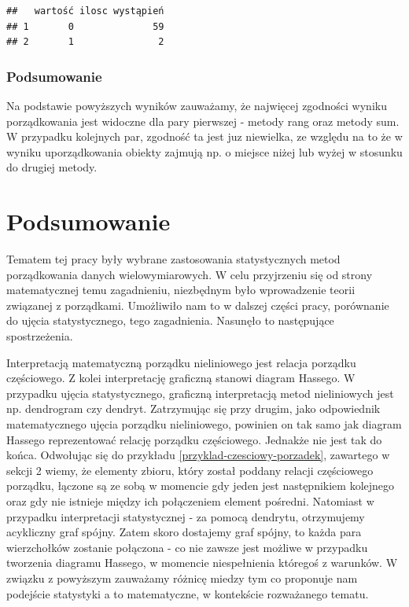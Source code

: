 \documentclass[12pt,a4paper]{report}
\begin{document}
{\begin{verbatim}
##   wartość ilosc wystąpień
## 1       0              59
## 2       1               2
\end{verbatim}

\subsection{Podsumowanie}\label{podsumowanie}

Na podstawie powyższych wyników zauważamy, że najwięcej zgodności wyniku
porządkowania jest widoczne dla pary pierwszej - metody rang oraz metody
sum. W przypadku kolejnych par, zgodność ta jest juz niewielka, ze
względu na to że w wyniku uporządkowania obiekty zajmują np. o miejsce
niżej lub wyżej w stosunku do drugiej metody.


}
\chapter{Podsumowanie}
Tematem tej pracy były wybrane zastosowania statystycznych metod porządkowania danych wielowymiarowych. W celu przyjrzeniu się od strony matematycznej temu zagadnieniu, niezbędnym było wprowadzenie teorii związanej z porządkami. Umożliwiło nam to w dalszej części pracy, porównanie do ujęcia statystycznego, tego zagadnienia. Nasunęło to następujące spostrzeżenia. 

Interpretacją matematyczną porządku nieliniowego jest relacja porządku częściowego. Z kolei interpretację graficzną stanowi diagram Hassego. W przypadku ujęcia statystycznego, graficzną interpretacją metod nieliniowych jest np. dendrogram czy dendryt. Zatrzymując się przy drugim, jako odpowiednik matematycznego ujęcia porządku nieliniowego, powinien on tak samo jak diagram Hassego reprezentować relację porządku częściowego. Jednakże nie jest tak do końca.
Odwołując się do przykładu \ref{przyklad-czesciowy-porzadek}, zawartego w sekcji 2 wiemy, że elementy zbioru, który został poddany relacji częściowego porządku, łączone są ze sobą w momencie gdy jeden jest następnikiem kolejnego oraz gdy nie istnieje między ich połączeniem element pośredni. Natomiast w przypadku interpretacji statystycznej - za pomocą dendrytu, otrzymujemy acykliczny graf spójny. Zatem skoro dostajemy graf spójny, to każda para wierzchołków zostanie połączona - co nie zawsze jest możliwe w przypadku tworzenia diagramu Hassego, w momencie niespełnienia któregoś z warunków. W związku z powyższym zauważamy różnicę miedzy tym co proponuje nam podejście statystyki a to matematyczne, w kontekście rozważanego tematu.
\end{document}
